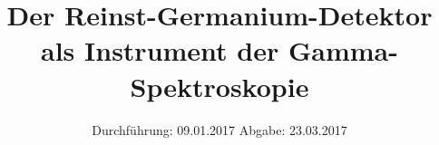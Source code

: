 

\subject{Versuch Nr. 18}
\title{Der Reinst-Germanium-Detektor als Instrument der Gamma-Spektroskopie}
\date{
  Durchführung: 09.01.2017
  \hspace{3em}
  Abgabe: 23.03.2017 
}



\listoftodos

\maketitle
\thispagestyle{empty}
\tableofcontents
\newpage






\printbibliography


